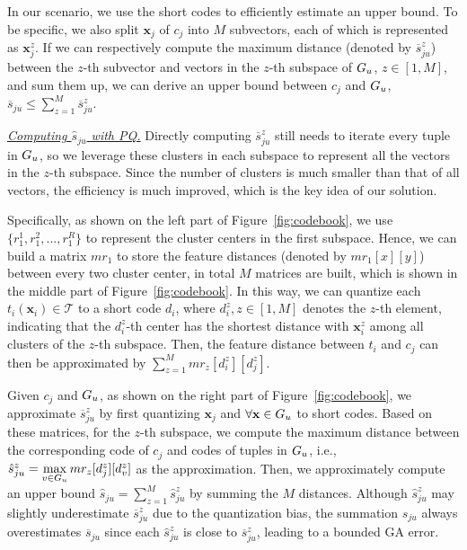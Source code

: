   
  
  In our scenario, we use the short codes to efficiently estimate an upper bound.
  To be specific, we also split  $\mathbf{x}_{j}$ of $c_j$  into $M$ subvectors, each of which is represented  as $\mathbf{x}^z_{j}$. If we can respectively compute the maximum distance (denoted by $\overline{s}_{ju}^z$) between the $z$-th subvector and vectors in the $z$-th  subspace of $G_u$, $z\in [1,M]$, and sum them up, we can derive  an upper bound  between $c_j$ and $G_u$, \ie $ \overline{s}_{ju} \leq  \sum_{z = 1}^M  \overline{s}_{ju}^z$.

\noindent  \underline{\textit{Computing $\hat{s}_{ju}$ with PQ.}}
Directly computing $\overline{s}_{ju}^z$ still needs to iterate every tuple in $G_u$, so we leverage these  clusters in each subspace to represent all the vectors in the $z$-th subspace. Since the number of clusters is much smaller than that of all vectors, the efficiency is much improved, which is the key idea of our solution.
%


 Specifically, as shown on the left part of Figure~\ref{fig:codebook}, we use $\{r_1^1, r_1^2,..., r_1^R\}$ to represent the  cluster centers in the first subspace. %
 Hence, we can build a matrix $mr_1$ to store the feature distances (denoted by $mr_1[x][y]$) between every two cluster center, in total  $M$ matrices are built, which is shown in the middle part of Figure~\ref{fig:codebook}.
 In this way, we can quantize each $t_i (\mathbf{x}_i) \in \mathcal{T}$  to a short code $d_i$, where $d_i^z, z\in[1,M]$  denotes the $z$-th element, indicating that the $d_i^z$-th center has the shortest distance with $\mathbf{x}_i^z$ among all clusters of the $z$-th subspace. 
 Then, the feature distance between  $t_i$ and $c_j$ can then be approximated by $\sum_{z=1}^{M}mr_z[d_i^z][d_j^z]$.

Given $c_j$ and $G_u$, as shown on the right part of Figure~\ref{fig:codebook}, we approximate $\overline{s}_{ju}^z$ by first quantizing $\mathbf{x}_{j}$ and  $\forall \mathbf{x} \in G_u$ to short codes. Based on these matrices, for the $z$-th subspace, we compute the maximum distance between the corresponding code of $c_j$ and codes of tuples in $G_u$, i.e., $\hat{s}_{ju}^z = \max\limits_{v\in G_u}mr_z[d_{j}^z][d_v^z]$ as the approximation. Then, we approximately compute an upper bound $\hat{s}_{ju}=\sum_{z=1}^{M}\hat{s}_{ju}^z$ by summing the $M$ distances. Although $\hat{s}_{ju}^z$ may slightly underestimate $\overline{s}^z_{ju}$ due to the quantization bias, the summation $\hat{s}_{ju}$ always overestimates $\overline{s}_{ju}$ since each $\hat{s}_{ju}^z$ is close to $\overline{s}^z_{ju}$, leading to a bounded GA error.

